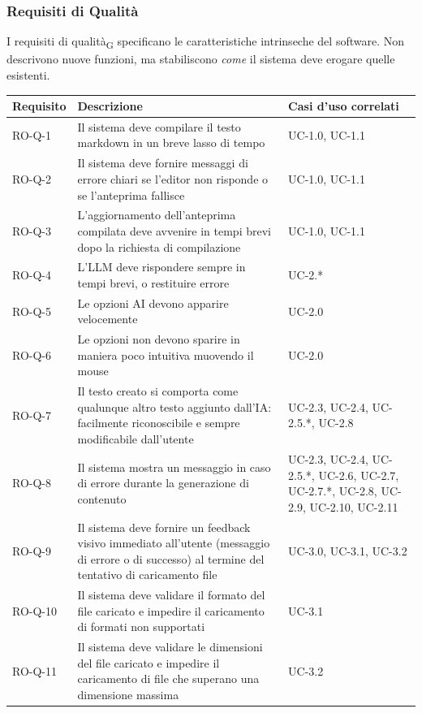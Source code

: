 \documentclass[11pt,a4paper]{article}
\begin{document}
\subsubsection{Requisiti di Qualità}
I requisiti di qualità\textsubscript{G} specificano le caratteristiche intrinseche del software. Non descrivono nuove funzioni, ma stabiliscono \textit{come} il sistema deve erogare quelle esistenti. 
\begin{longtable}{|p{}|>{\raggedright\arraybackslash}p{}|p{}|}
\hline
\textbf{Requisito} & \textbf{Descrizione} & \textbf{Casi d'uso correlati}\\
\hline

RO-Q-1 & Il sistema deve compilare il testo markdown in un breve lasso di tempo & UC-1.0, UC-1.1 \\
\hline
RO-Q-2 & Il sistema deve fornire messaggi di errore chiari se l'editor non risponde o se l'anteprima fallisce & UC-1.0, UC-1.1 \\
\hline
RO-Q-3 & L'aggiornamento dell'anteprima compilata deve avvenire in tempi brevi dopo la richiesta di compilazione & UC-1.0, UC-1.1 \\
\hline
RO-Q-4 & L'LLM deve rispondere sempre in tempi brevi, o restituire errore & UC-2.* \\
\hline
RO-Q-5 & Le opzioni AI devono apparire velocemente & UC-2.0 \\
\hline
RO-Q-6 & Le opzioni non devono sparire in maniera poco intuitiva muovendo il mouse & UC-2.0 \\
\hline
RO-Q-7 & Il testo creato si comporta come qualunque altro testo aggiunto dall'IA: facilmente riconoscibile e sempre modificabile dall'utente & UC-2.3, UC-2.4, UC-2.5.*, UC-2.8 \\
\hline
RO-Q-8 & Il sistema mostra un messaggio in caso di errore durante la generazione di contenuto & UC-2.3, UC-2.4, UC-2.5.*, UC-2.6, UC-2.7, UC-2.7.*, UC-2.8, UC-2.9, UC-2.10, UC-2.11 \\
\hline
RO-Q-9 & Il sistema deve fornire un feedback visivo immediato all'utente (messaggio di errore o di successo) al termine del tentativo di caricamento file & UC-3.0, UC-3.1, UC-3.2 \\
\hline
RO-Q-10 & Il sistema deve validare il formato del file caricato e impedire il caricamento di formati non supportati & UC-3.1 \\
\hline
RO-Q-11 & Il sistema deve validare le dimensioni del file caricato e impedire il caricamento di file che superano una dimensione massima & UC-3.2 \\

\end{longtable}
\end{document}
